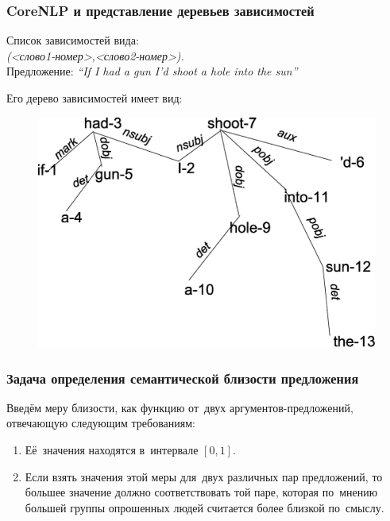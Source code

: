 \documentclass{beamer}
\begin{document}
\begin{frame}
\frametitle{CoreNLP и представление деревьев зависимостей}


Список зависимостей вида:\\
{\it <тип зависимости>(<слово1-номер>,<слово2-номер>).}\\
\vspace{0.2cm}
Предложение: {\it ``If I had a gun I'd shoot a hole into the sun''}

Его дерево зависимостей имеет вид:

\begin{figure}
\begin{center}
\includegraphics[scale=0.29]{../eps/dependency_tree.eps}
\end{center}
\end{figure}

\end{frame}

\begin{frame}
\frametitle{Задача определения семантической близости предложения}

Введём меру близости, как функцию от~двух аргументов-предложений, отвечающую следующим требованиям:

\begin{enumerate}

\item {
Её~значения находятся в~интервале $[0,1]$.
}

\item {
Если взять значения этой меры для~двух различных пар предложений, 
то большее значение должно соответствовать той паре, которая по~мнению большей группы опрошенных людей считается более близкой по~смыслу.
}

\end{enumerate}
\end{frame}
\end{document}
